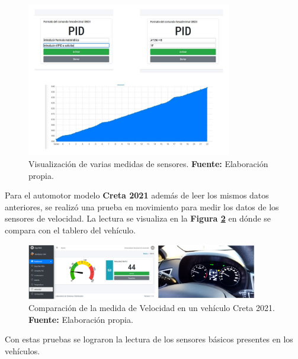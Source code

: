 \begin{figure}[H]
	\centering
	\includegraphics[width=0.8\textwidth]{./Cap6imagen/grafica_fig_c6.jpg}
	\caption [Visualización de varias medidas de sensores.]{Visualización de varias medidas de sensores.  \textbf{ Fuente:} %
		Elaboración propia.}
	\label{grafica_ref_c6} %
\end{figure}

Para el automotor modelo \textbf{Creta 2021} además de leer los mismos datos anteriores, se realizó una prueba en movimiento para medir los datos de los sensores de velocidad. La lectura se visualiza en la \textbf{Figura \ref{vel_ref_c6}} en dónde se compara con el tablero del vehículo.

\begin{figure}[H]
	\centering
	\includegraphics[width=0.9\textwidth]{./Cap6imagen/vel_fig_c6.png}
	\caption [Comparación de la medida de Velocidad en un vehículo Creta 2021.]{Comparación de la medida de Velocidad en un vehículo Creta 2021.  \textbf{ Fuente:} %
		Elaboración propia.}
	\label{vel_ref_c6} %
\end{figure}

Con estas pruebas se lograron la lectura de los sensores básicos presentes en los vehículos. 